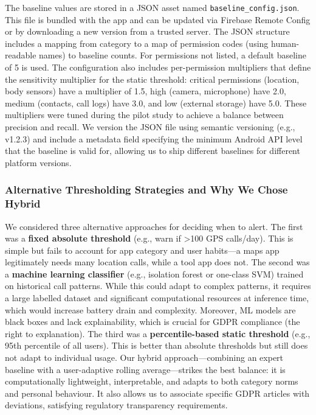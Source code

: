 The baseline values are stored in a JSON asset named \texttt{baseline\_config.json}. This file is bundled with the app and can be updated via Firebase Remote Config or by downloading a new version from a trusted server. The JSON structure includes a mapping from category to a map of permission codes (using human-readable names) to baseline counts. For permissions not listed, a default baseline of 5 is used. The configuration also includes per-permission multipliers that define the sensitivity multiplier for the static threshold: critical permissions (location, body sensors) have a multiplier of 1.5, high (camera, microphone) have 2.0, medium (contacts, call logs) have 3.0, and low (external storage) have 5.0. These multipliers were tuned during the pilot study to achieve a balance between precision and recall. We version the JSON file using semantic versioning (e.g., v1.2.3) and include a metadata field specifying the minimum Android API level that the baseline is valid for, allowing us to ship different baselines for different platform versions.

\subsubsection{Alternative Thresholding Strategies and Why We Chose Hybrid}

We considered three alternative approaches for deciding when to alert. The first was a \textbf{fixed absolute threshold} (e.g., warn if >100 GPS calls/day). This is simple but fails to account for app category and user habits—a maps app legitimately needs many location calls, while a tool app does not. The second was a \textbf{machine learning classifier} (e.g., isolation forest or one-class SVM) trained on historical call patterns. While this could adapt to complex patterns, it requires a large labelled dataset and significant computational resources at inference time, which would increase battery drain and complexity. Moreover, ML models are black boxes and lack explainability, which is crucial for GDPR compliance (the right to explanation). The third was a \textbf{percentile-based static threshold} (e.g., 95th percentile of all users). This is better than absolute thresholds but still does not adapt to individual usage. Our hybrid approach—combining an expert baseline with a user-adaptive rolling average—strikes the best balance: it is computationally lightweight, interpretable, and adapts to both category norms and personal behaviour. It also allows us to associate specific GDPR articles with deviations, satisfying regulatory transparency requirements.

